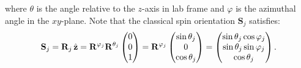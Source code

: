 \documentclass[aps, prx, nofootinbib, superscriptaddress]{revtex4-2}
\begin{document}
where $\theta$ is the angle relative to the $z$-axis in lab frame and $\varphi$ is the azimuthal angle in the $xy$-plane.
Note that the classical spin orientation $\mathbf{S}_j$ satisfies:
\begin{equation}
    \mathbf{S}_{j} 
    = \mathbf{R}_{j} \, \hat{\bf z} 
    = \mathbf{R}^{\varphi_{j}} \mathbf{R}^{\theta_{j}} 
    \begin{pmatrix} 
        0 \\ 0 \\ 1 
    \end{pmatrix} 
    = \mathbf{R}^{\varphi_j} 
    \begin{pmatrix} 
        \sin \theta_{j} \\ 0 \\ \cos \theta_{j} 
    \end{pmatrix} 
    = 
    \begin{pmatrix} 
        \sin \theta_{j} \cos \varphi_{j} \\ \sin \theta_{j} \sin \varphi_{j} \\ \cos \theta_{j} 
    \end{pmatrix}.
\end{equation}
\end{document}
